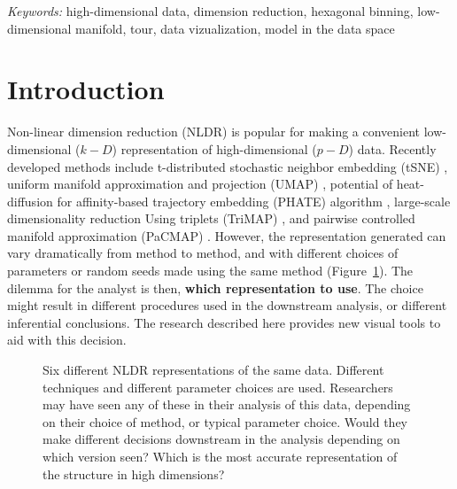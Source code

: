 \documentclass[
  12pt]{article}
\begin{document}
\noindent%
{\it Keywords:} high-dimensional data, dimension reduction, hexagonal
binning, low-dimensional manifold, tour, data vizualization, model in
the data space
\vfill

\newpage
{} %


\section{Introduction}\label{introduction}

Non-linear dimension reduction (NLDR) is popular for making a convenient
low-dimensional (\(k-D\)) representation of high-dimensional (\(p-D\))
data. Recently developed methods include t-distributed stochastic
neighbor embedding (tSNE) \citep{Laurens2008}, uniform manifold
approximation and projection (UMAP) \citep{Leland2018}, potential of
heat-diffusion for affinity-based trajectory embedding (PHATE) algorithm
\citep{article03}, large-scale dimensionality reduction Using triplets
(TriMAP) \citep{article02}, and pairwise controlled manifold
approximation (PaCMAP) \citep{Yingfan2021}. However, the representation
generated can vary dramatically from method to method, and with
different choices of parameters or random seeds made using the same
method (Figure~\ref{fig-NLDR-variety}). The dilemma for the analyst is
then, \textbf{which representation to use}. The choice might result in
different procedures used in the downstream analysis, or different
inferential conclusions. The research described here provides new visual
tools to aid with this decision.

\begin{figure}


\caption{\label{fig-NLDR-variety}Six different NLDR representations of
the same data. Different techniques and different parameter choices are
used. Researchers may have seen any of these in their analysis of this
data, depending on their choice of method, or typical parameter choice.
Would they make different decisions downstream in the analysis depending
on which version seen? Which is the most accurate representation of the
structure in high dimensions?}

\end{figure}%
\end{document}
